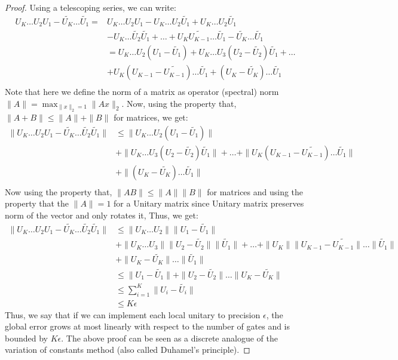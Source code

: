 \begin{proof}
    Using a telescoping series, we can write:
    \begin{align*}
        U_K\ldots U_2U_1 - \tilde{U_K}\ldots \tilde{U_1} = & U_K\ldots U_2U_1-U_K\ldots U_2 \tilde{U_1} + U_K\ldots U_2\tilde{U_1} \\
        & - U_K \ldots \tilde{U_2}\tilde{U_1}+\ldots+U_K\tilde{U_{K-1}}\ldots \tilde{U_1}-\tilde{U_K}\ldots \tilde{U_1} \\
        &= U_K\ldots U_2(U_1-\tilde{U_1}) + U_K\ldots U_3(U_2-\tilde{U_2})\tilde{U_1} + \ldots \\
        & + U_K(U_{K-1}-\tilde{U_{K-1}})\ldots \tilde{U_1} + (U_K-\tilde{U_K})\ldots \tilde{U_1} \\
    \end{align*}
    Note that here we define the norm of a matrix as operator (spectral) norm $\|A\|=\max_{\|x\|_2=1}\|Ax\|_2$.
    Now, using the property that, $\|A+B\| \leq \|A\|+\|B\|$ for matrices, we get:
    \begin{align*}
        \|U_K\ldots U_2U_1-\tilde{U_K}\ldots \tilde{U_2}\tilde{U_1}\| & \leq \|U_K\ldots U_2(U_1-\tilde{U_1})\| \\
        & + \|U_K\ldots U_3(U_2-\tilde{U_2})\tilde{U_1}\| + \ldots + \|U_K(U_{K-1}-\tilde{U_{K-1}})\ldots \tilde{U_1}\| \\
        & + \|(U_K-\tilde{U_K})\ldots \tilde{U_1}\| \\
    \end{align*}
    Now using the property that, $\|AB\| \leq \|A\|\|B\|$ for matrices and using the property that the $\|A\|=1$ for a Unitary matrix since Unitary matrix preserves norm
    of the vector and only rotates it, Thus, we get:
    \begin{align*}
        \|U_K\ldots U_2U_1-\tilde{U_K}\ldots \tilde{U_2}\tilde{U_1}\| & \leq \|U_K\ldots U_2\|\|U_1-\tilde{U_1}\| \\
        & + \|U_K\ldots U_3\|\|U_2-\tilde{U_2}\|\|\tilde{U_1}\| + \ldots + \|U_K\|\|U_{K-1}-\tilde{U_{K-1}}\|\ldots \|\tilde{U_1}\| \\
        & + \|U_K-\tilde{U_K}\|\ldots \|\tilde{U_1}\| \\
        &\leq\|U_1-\tilde{U_1}\|+\|U_2-\tilde{U_2}\|\ldots \|U_K-\tilde{U_K}\| \\
        & \leq \sum_{i=1}^K\|U_i-\tilde{U_i}\| \\
        & \leq K\epsilon
    \end{align*}
    Thus, we say that if we can implement each local unitary to precision $\epsilon$, the global error grows at most linearly with
    respect to the number of gates and is bounded by $K\epsilon$.
    The above proof can be seen as a discrete analogue of the variation of constants method (also called Duhamel's principle).
\end{proof}

